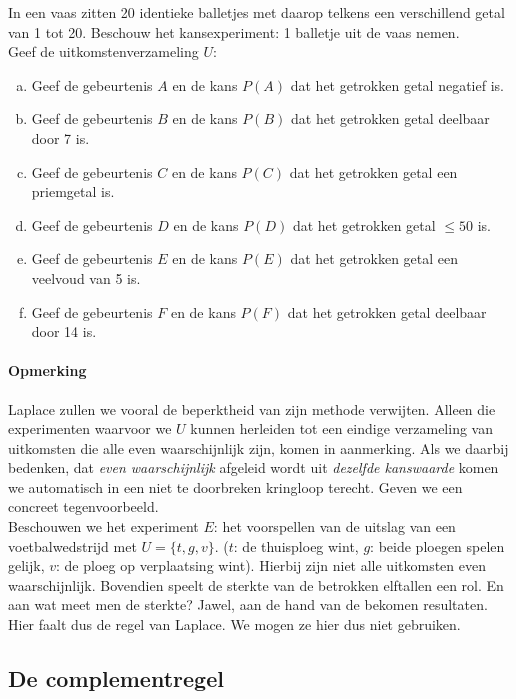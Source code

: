 \documentclass[12pt,twoside]{article}
\begin{document}
\begin{oefening}
In een vaas zitten 20 identieke balletjes met daarop telkens een verschillend getal van 1 tot 20. Beschouw het kansexperiment: 1 balletje uit de vaas nemen.\\
Geef de uitkomstenverzameling $U$:
\begin{enumerate}[(a)]
  \item Geef de gebeurtenis $A$ en de kans $P(A)$ dat het getrokken getal negatief is.
  \item Geef de gebeurtenis $B$ en de kans $P(B)$ dat het getrokken getal deelbaar door 7 is.
  \item Geef de gebeurtenis $C$ en de kans $P(C)$ dat het getrokken getal een priemgetal is.
  \item Geef de gebeurtenis $D$ en de kans $P(D)$ dat het getrokken getal $\leq 50$ is.
  \item Geef de gebeurtenis $E$ en de kans $P(E)$ dat het getrokken getal een veelvoud van 5 is.
  \item Geef de gebeurtenis $F$ en de kans $P(F)$ dat het getrokken getal deelbaar door 14 is.
\end{enumerate}
\end{oefening}

\paragraph*{Opmerking}
Laplace zullen we vooral de beperktheid van zijn methode verwijten. Alleen die
experimenten waarvoor we $U$ kunnen herleiden tot een eindige verzameling van
uitkomsten die alle even waarschijnlijk zijn, komen in aanmerking. Als we daarbij
bedenken, dat {\em even waarschijnlijk} afgeleid wordt uit {\em dezelfde kanswaarde}
komen we automatisch in een niet te doorbreken kringloop terecht. Geven we een
concreet tegenvoorbeeld.\\
Beschouwen we het experiment $E$: het voorspellen van de uitslag van een
voetbalwedstrijd met $U = \{t, g, v\}$. ($t$: de thuisploeg wint, $g$: beide ploegen spelen
gelijk, $v$: de ploeg op verplaatsing wint). Hierbij zijn niet alle uitkomsten even
waarschijnlijk. Bovendien speelt de sterkte van de betrokken elftallen een rol. En aan
wat meet men de sterkte? Jawel, aan de hand van de bekomen resultaten. Hier faalt
dus de regel van Laplace. We mogen ze hier dus niet gebruiken.

\subsection{De complementregel}
\end{document}
